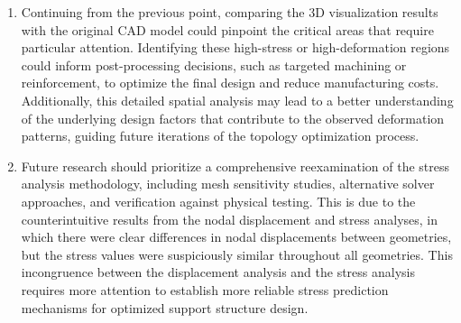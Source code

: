 \documentclass[../main.tex]{subfiles}
\begin{document}
\begin{enumerate}
  \item Continuing from the previous point, comparing the 3D visualization results with the original CAD model could pinpoint the critical areas that require particular attention. Identifying these high-stress or high-deformation regions could inform post-processing decisions, such as targeted machining or reinforcement, to optimize the final design and reduce manufacturing costs. Additionally, this detailed spatial analysis may lead to a better understanding of the underlying design factors that contribute to the observed deformation patterns, guiding future iterations of the topology optimization process.

  \item Future research should prioritize a comprehensive reexamination of the stress analysis methodology, including mesh sensitivity studies, alternative solver approaches, and verification against physical testing. This is due to the counterintuitive results from the nodal displacement and stress analyses, in which there were clear differences in nodal displacements between geometries, but the stress values were suspiciously similar throughout all geometries. This incongruence between the displacement analysis and the stress analysis requires more attention to establish more reliable stress prediction mechanisms for optimized support structure design.

\end{enumerate}
\end{document}
